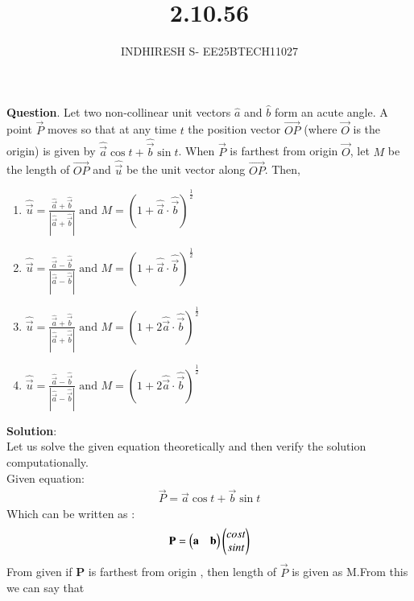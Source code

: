 \documentclass[journal]{IEEEtran}
\theoremstyle{remark}
\begin{document}

\onecolumn

\title{2.10.56}
\author{INDHIRESH S- EE25BTECH11027}
\maketitle


\renewcommand{\thefigure}{\theenumi}
\renewcommand{\thetable}{\theenumi}

\textbf{Question}.  Let two non-collinear unit vectors $\hat{a}$ and $\hat{b}$ form an acute angle. A point $\vec{P}$ moves so that at any time $t$ the position vector $\overrightarrow{OP}$ (where $\vec{O}$ is the origin) is given by $\hat{\vec{a}}\cos{t} + \hat{\vec{b}}\sin{t}$. When $\vec{P}$ is farthest from origin $\vec{O}$, let $M$ be the length of $\overrightarrow{OP}$ and $\hat{\vec{u}}$ be the unit vector along $\overrightarrow{OP}$. Then,
\begin{multicols}{2} 
    \begin{enumerate}
	    \item $\hat{\vec{u}} = \frac{\hat{\vec{a}}+\hat{\vec{b}}}{|\hat{\vec{a}}+\hat{\vec{b}}|} \text{ and } M = (1+\hat{\vec{a}} \cdot \hat{\vec{b}})^{\frac{1}{2}}$
    	\item $\hat{\vec{u}} = \frac{\hat{\vec{a}}-\hat{\vec{b}}}{|\hat{\vec{a}}-\hat{\vec{b}}|} \text{ and } M = (1+\hat{\vec{a}} \cdot \hat{\vec{b}})^{\frac{1}{2}}$
    	\item $\hat{\vec{u}} = \frac{\hat{\vec{a}}+\hat{\vec{b}}}{|\hat{\vec{a}}+\hat{\vec{b}}|} \text{ and } M = (1+2\hat{\vec{a}} \cdot \hat{\vec{b}})^{\frac{1}{2}}$
    	\item $\hat{\vec{u}} = \frac{\hat{\vec{a}}-\hat{\vec{b}}}{|\hat{\vec{a}}-\hat{\vec{b}}|} \text{ and } M = (1+2\hat{\vec{a}} \cdot \hat{\vec{b}})^{\frac{1}{2}}$
    \end{enumerate}
    \end{multicols}
\textbf{Solution}:\\
Let us solve the given equation theoretically and then verify the solution computationally. \\
Given equation:
\begin{align}
     \Vec{P}=\vec{a}\cos{t} + \vec{b}\sin{t}
\end{align}
Which can be written as :
\begin{align}
    \Vec{P}=\myvec{\vec{a}&\vec{b}}\myvec{cost\\sint}
\end{align}
From given if \textbf{P} is farthest from origin , then length of $\vec{P}$ is given as M.From this we can say  that
\end{document}
